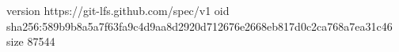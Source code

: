 version https://git-lfs.github.com/spec/v1
oid sha256:589b9b8a5a7f63fa9c4d9aa8d2920d712676e2668eb817d0c2ca768a7ea31c46
size 87544
